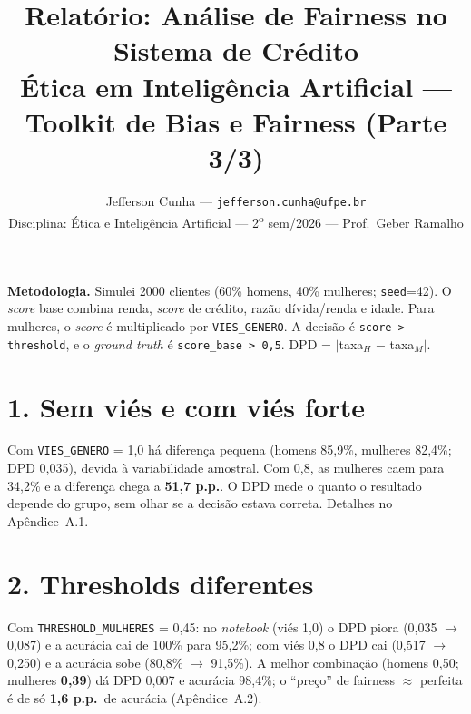 \documentclass[10pt,a4paper]{article}
\title{\vspace{-1.4cm}\textbf{Relat\'orio: An\'alise de Fairness no Sistema de Cr\'edito}\\[2pt]
\normalsize \'Etica em Intelig\^encia Artificial --- Toolkit de Bias e Fairness (Parte 3/3)\vspace{-0.4cm}}
\author{\small Jefferson Cunha --- \texttt{jefferson.cunha@ufpe.br}\\[1pt]
\small Disciplina: \'Etica e Intelig\^encia Artificial --- 2\textsuperscript{o} sem/2026 --- Prof.\ Geber Ramalho}
\date{\vspace{-0.6cm}}
\begin{document}
\maketitle

\textbf{Metodologia.} Simulei 2000 clientes (60\% homens, 40\% mulheres; \texttt{seed}=42). O \textit{score} base combina renda, \textit{score} de cr\'edito, raz\~ao d\'ivida/renda e idade. Para mulheres, o \textit{score} \'e multiplicado por \texttt{VIES\_GENERO}. A decis\~ao \'e \texttt{score > threshold}, e o \textit{ground truth} \'e \texttt{score\_base > 0,5}. DPD = $|$taxa$_H$ $-$ taxa$_M|$.

\section*{1. Sem vi\'es e com vi\'es forte}
Com \texttt{VIES\_GENERO} = 1,0 h\'a diferen\c{c}a pequena (homens 85,9\%, mulheres 82,4\%; DPD 0,035), devida \`a variabilidade amostral. Com 0,8, as mulheres caem para 34,2\% e a diferen\c{c}a chega a \textbf{51,7 p.p.}. O DPD mede o quanto o resultado depende do grupo, sem olhar se a decis\~ao estava correta. Detalhes no Ap\^endice~A.1.

\section*{2. Thresholds diferentes}
Com \texttt{THRESHOLD\_MULHERES} = 0,45: no \textit{notebook} (vi\'es 1,0) o DPD piora (0,035 $\to$ 0,087) e a acur\'acia cai de 100\% para 95,2\%; com vi\'es 0,8 o DPD cai (0,517 $\to$ 0,250) e a acur\'acia sobe (80,8\% $\to$ 91,5\%). A melhor combina\c{c}\~ao (homens 0,50; mulheres \textbf{0,39}) d\'a DPD 0,007 e acur\'acia 98,4\%; o ``pre\c{c}o'' de fairness $\approx$ perfeita \'e de s\'o \textbf{1,6 p.p.}\ de acur\'acia (Ap\^endice~A.2).
\end{document}
